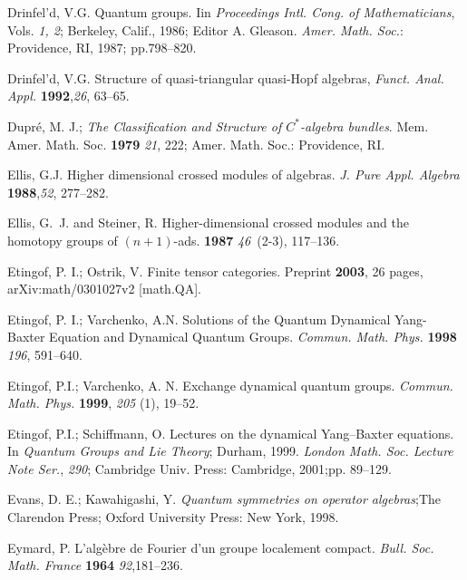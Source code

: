 \documentclass[12pt]{article}
\theoremstyle{plain}
\theoremstyle{definition}
\numberwithin{equation}{section}
\begin{document}
\begin{thebibliography}{199}
Drinfel'd, V.G. Quantum groups. Iin  {\em Proceedings Intl. Cong. of Mathematicians}, Vols. {\em 1, 2}; Berkeley, Calif., 1986; Editor A. Gleason. {\em  Amer. Math. Soc.}: Providence, RI, 1987; pp.798--820.

Drinfel'd, V.G.  Structure of quasi-triangular quasi-Hopf algebras, \textit{Funct. Anal. Appl.} {\bf 1992},{\em 26}, 63--65.

Dupr\'{e}, M. J.; \emph{The Classification and Structure of $C^*$-algebra bundles}. Mem. Amer. Math. Soc. {\bf 1979} {\em 21}, 222; Amer. Math. Soc.: Providence, RI.

Ellis, G.J.  Higher dimensional crossed modules of algebras. \emph{J. Pure Appl. Algebra} {\bf 1988},{\em 52}, 277--282.

Ellis, G.~J. and Steiner, R. Higher-dimensional crossed modules and the homotopy groups  of $(n+1)$-ads.
 {\bf 1987} {\em 46}~(2-3), 117--136.

Etingof, P. I.; Ostrik, V.  Finite tensor categories. Preprint {\bf2003}, 26 pages, arXiv:math/0301027v2 [math.QA]. 


Etingof, P. I.; Varchenko, A.N.  Solutions of the Quantum Dynamical Yang-Baxter Equation and Dynamical Quantum Groups. \emph{Commun. Math. Phys.}
\textbf{1998} \emph{196}, 591--640.

Etingof, P.I.; Varchenko, A. N.  Exchange dynamical quantum groups.  \emph{Commun. Math. Phys.} \textbf{1999}, \emph{205} (1), 19--52.

Etingof, P.I.; Schiffmann, O.  Lectures on the dynamical Yang--Baxter equations.  In {\em Quantum Groups and Lie Theory}; Durham, 1999. {\it London Math. Soc. Lecture Note Ser.}, {\em 290}; Cambridge Univ. Press: Cambridge, 2001;pp. 89--129. 

Evans, D. E.; Kawahigashi, Y.  {\em Quantum symmetries on operator algebras};The Clarendon Press; Oxford University Press: New York, 1998.

Eymard, P.  L'alg\`ebre de Fourier d'un groupe localement compact. {\em Bull. Soc. Math. France} {\bf 1964} {\em 92},181--236.


\end{thebibliography}
\end{document}

